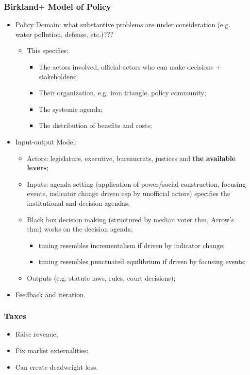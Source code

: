 \documentclass[aspectratio=169]{beamer}
\theoremstyle{principle}
\begin{document}
\begin{frame}
\frametitle{Birkland$+$ Model of Policy}
\begin{itemize}
\item Policy Domain: what substantive problems are under consideration (e.g. water pollution, defense, etc.)???
\begin{itemize}
\item This specifies:
\begin{itemize}
\item The actors involved, official actors who can make decisions $+$ stakeholders; 
\item Their organization, e.g. iron triangle, policy community;
\item The systemic agenda; 
\item The distribution of benefits and costs;
\end{itemize} 
\end{itemize}
\bigskip
\item \color{black}Input-output Model;
\begin{itemize}
\item Actors: legislature, executive, bureaucrats, justices and \textbf{the available levers};
\item Inputs: agenda setting (application of power/social construction, focusing events, indicator change driven esp by unofficial actors) specifies the institutional and decision agendas;
\item Black box decision making (structured by median voter thm, Arrow's thm) works on the decision agenda;
\begin{itemize}
\item timing resembles incrementalism if driven by indicator change;
\item timing resembles punctuated equilibrium if driven by focusing events;
 \end{itemize}
\item Outputs (e.g. statute laws, rules, court decisions);
\end{itemize}
\bigskip
\item Feedback and iteration.
\end{itemize}
\end{frame}

\begin{frame}
\frametitle{Taxes}
\begin{itemize}
\item Raise revenue;
\bigskip
\bigskip
\bigskip
\item Fix market externalities;
\bigskip
\bigskip
\bigskip
\item Can create deadweight loss.
\end{itemize}

\end{frame}
\end{document}
